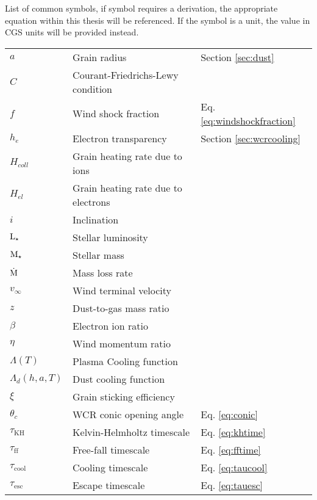 \begin{Common_Symbols}

List of common symbols, if symbol requires a derivation, the appropriate equation within this thesis will be referenced. If the symbol is a unit, the value in CGS units will be provided instead. 

\begin{longtable}[c]{l|l|l}
  \hline
  \endhead
  \hline
  \endfoot




  $a$ & Grain radius & Section \ref{sec:dust} \\
  $C$ & Courant-Friedrichs-Lewy condition & \\
  $f$ & Wind shock fraction & Eq. \ref{eq:windshockfraction} \\
  $h_e$ & Electron transparency & Section \ref{sec:wcrcooling} \\
  $H_{coll}$ & Grain heating rate due to ions & \\
  $H_{el}$ & Grain heating rate due to electrons & \\
  $i$ & Inclination & \\
  $\text{L}_\star$ & Stellar luminosity & \\
  $\text{M}_\star$ & Stellar mass & \\
  $\dot{\text{M}}$ & Mass loss rate & \\
  $v_\infty$ & Wind terminal velocity & \\
  $z$ & Dust-to-gas mass ratio  & \\


  $\beta$ & Electron ion ratio & \\
  $\eta$ & Wind momentum ratio  & \\
  
  $\Lambda(T)$ & Plasma Cooling function & \\
  $\Lambda_d(h,a,T)$ & Dust cooling function & \\

  $\xi$ & Grain sticking efficiency & \\

  $\theta_c$ & WCR conic opening angle & Eq. \ref{eq:conic} \\
  
  $\tau_\text{KH}$ & Kelvin-Helmholtz timescale & Eq. \ref{eq:khtime} \\
  $\tau_\text{ff}$ & Free-fall timescale & Eq. \ref{eq:fftime} \\
  $\tau_\text{cool}$ & Cooling timescale & Eq. \ref{eq:taucool} \\
  $\tau_\text{esc}$ & Escape timescale & Eq. \ref{eq:tauesc} \\


\end{longtable}
\end{Common_Symbols}
